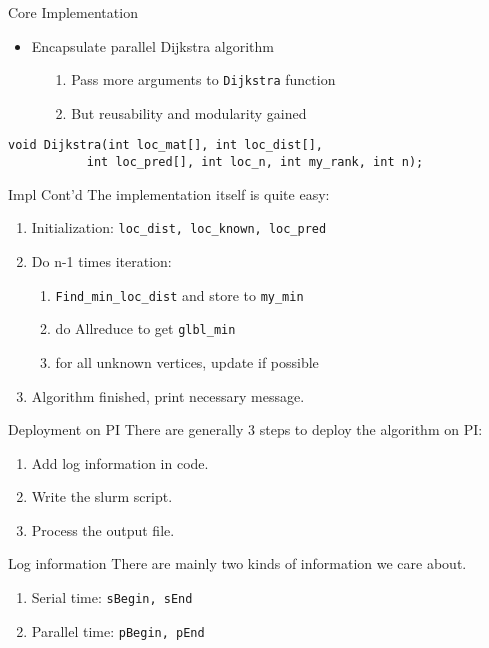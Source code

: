 \documentclass{beamer}
\begin{document}
\begin{frame}[fragile]{Core Implementation}
\begin{itemize}
\item Encapsulate parallel Dijkstra algorithm
\begin{itemize}
	\item[1.] Pass more arguments to \texttt{Dijkstra} function
	\item[2.] But reusability and modularity gained
\end{itemize}

\end{itemize}

\centering
\begin{verbatim}
void Dijkstra(int loc_mat[], int loc_dist[], 
           int loc_pred[], int loc_n, int my_rank, int n);
\end{verbatim}
\end{frame}

\begin{frame}[fragile]{Impl Cont'd}
The implementation itself is quite easy:
\begin{enumerate}
	\item Initialization: \verb|loc_dist, loc_known, loc_pred|
	\item Do n-1 times iteration:
	\quad \begin{enumerate}
		\item \verb|Find_min_loc_dist| and store to \verb|my_min|
		\item do Allreduce to get \verb|glbl_min|
		\item for all unknown vertices, update if possible
	\end{enumerate}
	\item Algorithm finished, print necessary message.
\end{enumerate}
\end{frame}

\begin{frame}{Deployment on PI}
There are generally 3 steps to deploy the algorithm on PI:
\begin{enumerate}
	\item Add log information in code.
	\item Write the slurm script.
	\item Process the output file.
\end{enumerate}
\end{frame}

\begin{frame}[fragile]{Log information}
There are mainly two kinds of information we care about.
\begin{enumerate}
	\item Serial time: \verb|sBegin, sEnd|
	\item Parallel time: \verb|pBegin, pEnd|
\end{enumerate}
\end{frame}
\end{document}
